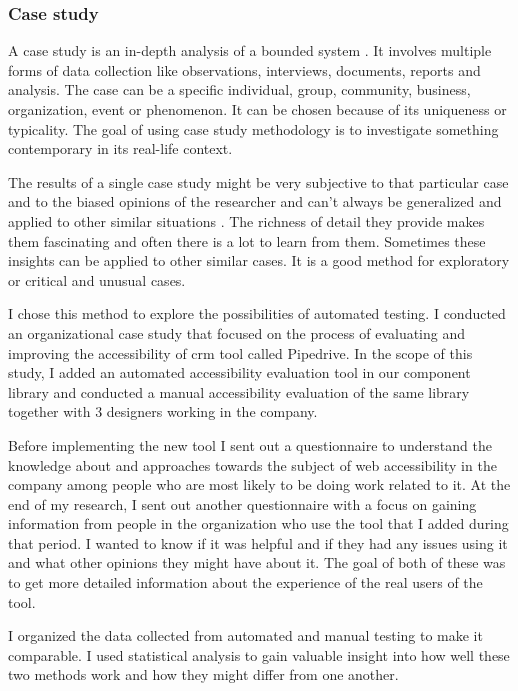 \documentclass{master_thesis}
\begin{document}
\subsubsection{Case study}

A case study is an in-depth analysis of a bounded system \citep{Range2023}. It involves multiple forms of data collection like observations, interviews, documents, reports and analysis. The case can be a specific individual, group, community, business, organization, event or phenomenon. It can be chosen because of its uniqueness or typicality. The goal of using case study methodology is to investigate something contemporary in its real-life context.

The results of a single case study might be very subjective to that particular case and to the biased opinions of the researcher and can't always be generalized and applied to other similar situations \citep{Range2023}. The richness of detail they provide makes them fascinating and often there is a lot to learn from them. Sometimes these insights can be applied to other similar cases. It is a good method for exploratory or critical and unusual cases.

I chose this method to explore the possibilities of automated testing. I conducted an organizational case study that focused on the process of evaluating and improving the accessibility of \ac{crm} tool called Pipedrive. In the scope of this study, I added an automated accessibility evaluation tool in our component library and conducted a manual accessibility evaluation of the same library together with 3 designers working in the company.

Before implementing the new tool I sent out a questionnaire to understand the knowledge about and approaches towards the subject of web accessibility in the company among people who are most likely to be doing work related to it. At the end of my research, I sent out another questionnaire with a focus on gaining information from people in the organization who use the tool that I added during that period. I wanted to know if it was helpful and if they had any issues using it and what other opinions they might have about it. The goal of both of these was to get more detailed information about the experience of the real users of the tool.

I organized the data collected from automated and manual testing to make it comparable. I used statistical analysis to gain valuable insight into how well these two methods work and how they might differ from one another.
\end{document}
